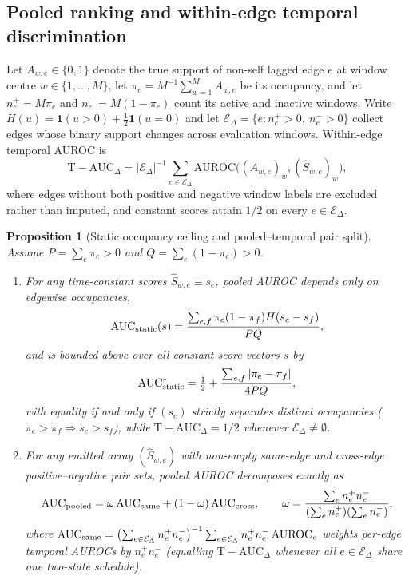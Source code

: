 \documentclass[11pt]{article}
\newcommand{\Tauc}{\mathrm{T\!-\!AUC}_{\Delta}}
\newtheorem{proposition}{Proposition}
\begin{document}
\subsection{Pooled ranking and within-edge temporal discrimination}
\label{sec:static-occupancy}
Let $A_{w,e}\in\{0,1\}$ denote the true support of non-self lagged edge $e$ at
window centre $w\in\{1,\dots,M\}$, let $\pi_e=M^{-1}\sum_{w=1}^{M} A_{w,e}$ be
its occupancy, and let $n_e^+=M\pi_e$ and $n_e^-=M(1-\pi_e)$ count its active
and inactive windows. Write $H(u)=\mathbf1(u>0)+\tfrac12\mathbf1(u=0)$ and let
$\mathcal E_\Delta=\{e:n_e^+>0,\ n_e^->0\}$ collect edges whose binary support
changes across evaluation windows. Within-edge temporal AUROC is
\begin{equation}
\Tauc=|\mathcal E_\Delta|^{-1}
\sum_{e\in\mathcal E_\Delta}\mathrm{AUROC}
\bigl((A_{w,e})_w,(\widehat S_{w,e})_w\bigr),
\label{eq:temporal-target}
\end{equation}
where edges without both positive and negative window labels are excluded
rather than imputed, and constant scores attain $1/2$ on every $e\in\mathcal E_\Delta$.

\begin{proposition}[Static occupancy ceiling and pooled--temporal pair split]
\label{prop:occupancy-pooled}
Assume $P=\sum_e\pi_e>0$ and $Q=\sum_e(1-\pi_e)>0$.
\begin{enumerate}
\item[(i)] For any time-constant scores $\widehat S_{w,e}\equiv s_e$, pooled
AUROC depends only on edgewise occupancies,
\begin{equation}
\mathrm{AUC}_{\rm static}(s)
=\frac{\sum_{e,f}\pi_e(1-\pi_f)H(s_e-s_f)}
{PQ},
\label{eq:auc-static}
\end{equation}
and is bounded above over all constant score vectors $s$ by
\begin{equation}
\mathrm{AUC}_{\rm static}^{*}
=\tfrac12+\frac{\sum_{e,f}|\pi_e-\pi_f|}{4PQ},
\label{eq:static-ceiling}
\end{equation}
with equality if and only if $(s_e)$ strictly separates distinct occupancies
($\pi_e>\pi_f\Rightarrow s_e>s_f$), while $\Tauc=1/2$ whenever
$\mathcal E_\Delta\neq\emptyset$.
\item[(ii)] For any emitted array $(\widehat S_{w,e})$ with non-empty same-edge
and cross-edge positive--negative pair sets, pooled AUROC decomposes exactly as
\begin{equation}
\mathrm{AUC}_{\rm pooled}=\omega\,\mathrm{AUC}_{\rm same}
+(1-\omega)\,\mathrm{AUC}_{\rm cross},\qquad
\omega=\frac{\sum_e n_e^+n_e^-}{(\sum_e n_e^+)(\sum_e n_e^-)},
\label{eq:pooled-split}
\end{equation}
where $\mathrm{AUC}_{\rm same}=\bigl(\sum_{e\in\mathcal E_\Delta}n_e^+ n_e^-\bigr)^{-1}
\sum_{e\in\mathcal E_\Delta}n_e^+ n_e^-\,\mathrm{AUROC}_e$ weights per-edge
temporal AUROCs by $n_e^+ n_e^-$ (equalling $\Tauc$ whenever all
$e\in\mathcal E_\Delta$ share one two-state schedule).
\end{enumerate}
\end{proposition}
\end{document}

